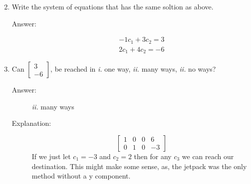 \documentclass{article}
\begin{document}
\begin{enumerate}
\begin{description}
\[                                \]
                        \end{description}
                    \item 
                        Write the system of equations that has the same soltion as above.
                        \begin{description}
                            \item[Answer:] 
                                \[
                                \begin{array}{c}
                                    -1c_1 + 3c_2 = 3 \\
                                    2c_1 + 4c_2 = -6
                                \end{array}
                                \]
                        \end{description}
                    
                    \item 
                        Can $\begin{bmatrix}3\\-6\end{bmatrix}$, be reached in \textit{i.} one way, \textit{ii.} many ways, \textit{ii.} no ways?
                        \begin{description}
                            \item[Answer:] 
                                \textit{ii.} many ways
                            \item[Explanation:]
                                \[
                                \left[
                                    \begin{array}{ccc|c}
                                    1 & 0 & 0 & 6 \\
                                    0 & 1 & 0 & -3
                                    \end{array}
                                \right]
                                \]
                                If we just let $c_1 = -3$ and $c_2 = 2$
                                then for any $c_3$ we can reach our destination.
                                This might make some sense, as, the jetpack was the only method without
                                a y component.
                        \end{description}
                
                \end{enumerate}

\clearpage


\end{document}
